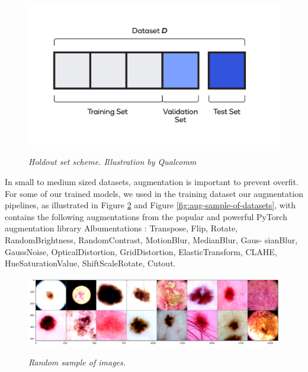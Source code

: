 \begin{figure}[H]
  \centering
  \begin{adjustbox}{width=0.7\textwidth, trim={0cm 1cm 0cm 1.25cm}, clip}
    \includegraphics[width=\textwidth]{imatges/data-training-strategies/train-test-validation-sets.png}
  \end{adjustbox}
  \caption[Holdout set scheme]{\textit{Holdout set scheme. Illustration by Qualcomm}}
  {\label{fig:holdout-test-scheme}}
\end{figure}

In small to medium sized datasets, augmentation is important to prevent
overfit. For some of our trained models, we used in the training dataset our
augmentation pipelines, as illustrated in Figure \ref{fig:sample-of-datasets} and
Figure \ref{fig:aug-sample-of-datasets}, with contains the following augmentations
from the popular and powerful PyTorch augmentation library Albumentations
\cite{Albumentations}: Transpose, Flip, Rotate, RandomBrightness,
RandomContrast, MotionBlur, MedianBlur, Gaus- sianBlur, GaussNoise,
OpticalDistortion, GridDistortion, ElasticTransform, CLAHE, HueSaturationValue,
ShiftScaleRotate, Cutout.

\begin{figure}[H] \centering
  \begin{adjustbox}{width=0.9\textwidth}
    \includegraphics[width=\textwidth]{imatges/methodological_contribution/random-sample-of-isic.png}
  \end{adjustbox}
  \caption[Random sample of images]{\textit{Random sample of images.}}
  {\label{fig:sample-of-datasets}}
\end{figure}

